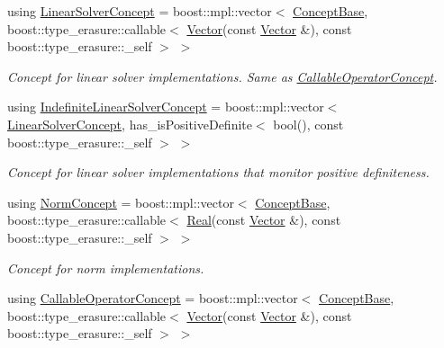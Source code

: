 \begin{DoxyCompactItemize}
using \hyperlink{group__ConceptGroup_gac7d6a94c7131c8613e2ab26fddeb50bd_gac7d6a94c7131c8613e2ab26fddeb50bd}{Linear\+Solver\+Concept} = boost\+::mpl\+::vector$<$ \hyperlink{group__ConceptGroup_ga63426675cc05ccce03ead56a4fa90d96_ga63426675cc05ccce03ead56a4fa90d96}{Concept\+Base}, boost\+::type\+\_\+erasure\+::callable$<$ \hyperlink{classSpacy_1_1Vector}{Vector}(const \hyperlink{classSpacy_1_1Vector}{Vector} \&), const boost\+::type\+\_\+erasure\+::\+\_\+self $>$ $>$
\begin{DoxyCompactList}\small\item\em Concept for linear solver implementations. Same as \hyperlink{group__ConceptGroup_gadec0c664abaacc2065dadd8b11cc8d30_CallableOperatorConceptAnchor}{Callable\+Operator\+Concept}. \end{DoxyCompactList}\item 
using \hyperlink{group__ConceptGroup_ga582dd34334cdecc7b27883f4e8239490_ga582dd34334cdecc7b27883f4e8239490}{Indefinite\+Linear\+Solver\+Concept} = boost\+::mpl\+::vector$<$ \hyperlink{group__ConceptGroup_gac7d6a94c7131c8613e2ab26fddeb50bd_gac7d6a94c7131c8613e2ab26fddeb50bd}{Linear\+Solver\+Concept}, has\+\_\+is\+Positive\+Definite$<$ bool(), const boost\+::type\+\_\+erasure\+::\+\_\+self $>$ $>$
\begin{DoxyCompactList}\small\item\em Concept for linear solver implementations that monitor positive definiteness. \end{DoxyCompactList}\item 
using \hyperlink{group__ConceptGroup_ga8b6032c46f6e31840a2c956c6360549b_ga8b6032c46f6e31840a2c956c6360549b}{Norm\+Concept} = boost\+::mpl\+::vector$<$ \hyperlink{group__ConceptGroup_ga63426675cc05ccce03ead56a4fa90d96_ga63426675cc05ccce03ead56a4fa90d96}{Concept\+Base}, boost\+::type\+\_\+erasure\+::callable$<$ \hyperlink{classSpacy_1_1Real}{Real}(const \hyperlink{classSpacy_1_1Vector}{Vector} \&), const boost\+::type\+\_\+erasure\+::\+\_\+self $>$ $>$
\begin{DoxyCompactList}\small\item\em Concept for norm implementations. \end{DoxyCompactList}\item 
using \hyperlink{group__ConceptGroup_gadec0c664abaacc2065dadd8b11cc8d30_gadec0c664abaacc2065dadd8b11cc8d30}{Callable\+Operator\+Concept} = boost\+::mpl\+::vector$<$ \hyperlink{group__ConceptGroup_ga63426675cc05ccce03ead56a4fa90d96_ga63426675cc05ccce03ead56a4fa90d96}{Concept\+Base}, boost\+::type\+\_\+erasure\+::callable$<$ \hyperlink{classSpacy_1_1Vector}{Vector}(const \hyperlink{classSpacy_1_1Vector}{Vector} \&), const boost\+::type\+\_\+erasure\+::\+\_\+self $>$ $>$

\end{DoxyCompactItemize}

